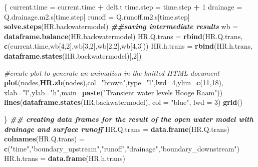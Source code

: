 \documentclass[
]{article}
\newenvironment{Shaded}{\begin{snugshade}}{\end{snugshade}}
\newcommand{\AttributeTok}[1]{\textcolor[rgb]{0.13,0.29,0.53}{#1}}
\newcommand{\CommentTok}[1]{\textcolor[rgb]{0.56,0.35,0.01}{\textit{#1}}}
\newcommand{\DecValTok}[1]{\textcolor[rgb]{0.00,0.00,0.81}{#1}}
\newcommand{\DocumentationTok}[1]{\textcolor[rgb]{0.56,0.35,0.01}{\textbf{\textit{#1}}}}
\newcommand{\FunctionTok}[1]{\textcolor[rgb]{0.13,0.29,0.53}{\textbf{#1}}}
\newcommand{\NormalTok}[1]{#1}
\newcommand{\OtherTok}[1]{\textcolor[rgb]{0.56,0.35,0.01}{#1}}
\newcommand{\SpecialCharTok}[1]{\textcolor[rgb]{0.81,0.36,0.00}{\textbf{#1}}}
\newcommand{\StringTok}[1]{\textcolor[rgb]{0.31,0.60,0.02}{#1}}
\begin{document}
\begin{Shaded}
\begin{Highlighting}[]
\NormalTok{\{}
\NormalTok{  current.time }\OtherTok{=}\NormalTok{ current.time }\SpecialCharTok{+}\NormalTok{ delt.t}
\NormalTok{  time.step }\OtherTok{=}\NormalTok{ time.step }\SpecialCharTok{+} \DecValTok{1}
\NormalTok{  drainage }\OtherTok{=}\NormalTok{ Q.drainage.m2.s[time.step]}
\NormalTok{  runoff }\OtherTok{=}\NormalTok{ Q.runoff.m2.s[time.step]}
  \FunctionTok{solve.steps}\NormalTok{(HR.backwatermodel)}
  \DocumentationTok{\#\#saving intermediate results}
\NormalTok{  wb }\OtherTok{=} \FunctionTok{dataframe.balance}\NormalTok{(HR.backwatermodel)}
\NormalTok{  HR.Q.trans }\OtherTok{=} \FunctionTok{rbind}\NormalTok{(HR.Q.trans, }\FunctionTok{c}\NormalTok{(current.time,wb[}\DecValTok{4}\NormalTok{,}\DecValTok{2}\NormalTok{],wb[}\DecValTok{3}\NormalTok{,}\DecValTok{2}\NormalTok{],wb[}\DecValTok{2}\NormalTok{,}\DecValTok{2}\NormalTok{],wb[}\DecValTok{4}\NormalTok{,}\DecValTok{3}\NormalTok{]))}
\NormalTok{  HR.h.trans }\OtherTok{=} \FunctionTok{rbind}\NormalTok{(HR.h.trans, }\FunctionTok{dataframe.states}\NormalTok{(HR.backwatermodel)[,}\DecValTok{2}\NormalTok{])}
  
  \CommentTok{\#create plot to generate an animation in the knitted HTML document}
  \FunctionTok{plot}\NormalTok{(nodes,}\FunctionTok{HR.zb}\NormalTok{(nodes),}\AttributeTok{col=}\StringTok{"brown"}\NormalTok{,}\AttributeTok{type=}\StringTok{"l"}\NormalTok{,}\AttributeTok{lwd=}\DecValTok{4}\NormalTok{,}\AttributeTok{ylim=}\FunctionTok{c}\NormalTok{(}\DecValTok{11}\NormalTok{,}\DecValTok{18}\NormalTok{),}
       \AttributeTok{xlab=}\StringTok{"l"}\NormalTok{,}\AttributeTok{ylab=}\StringTok{"h"}\NormalTok{,}\AttributeTok{main=}\FunctionTok{paste}\NormalTok{(}\StringTok{"Transient water levels Hooge Raam"}\NormalTok{))}
  \FunctionTok{lines}\NormalTok{(}\FunctionTok{dataframe.states}\NormalTok{(HR.backwatermodel), }\AttributeTok{col =} \StringTok{"blue"}\NormalTok{, }\AttributeTok{lwd =} \DecValTok{3}\NormalTok{)}
  \FunctionTok{grid}\NormalTok{()}
  
\NormalTok{\}}
  \DocumentationTok{\#\# creating data frames for the result of the open water model with drainage and surface runoff }
\NormalTok{ HR.Q.trans }\OtherTok{=} \FunctionTok{data.frame}\NormalTok{(HR.Q.trans)}
 \FunctionTok{colnames}\NormalTok{(HR.Q.trans) }\OtherTok{=} \FunctionTok{c}\NormalTok{(}\StringTok{"time"}\NormalTok{,}\StringTok{"boundary\_upstream"}\NormalTok{,}\StringTok{"runoff"}\NormalTok{,}\StringTok{"drainage"}\NormalTok{,}\StringTok{"boundary\_downstream"}\NormalTok{)}
\NormalTok{ HR.h.trans }\OtherTok{=} \FunctionTok{data.frame}\NormalTok{(HR.h.trans)}
\end{Highlighting}
\end{Shaded}
\end{document}
